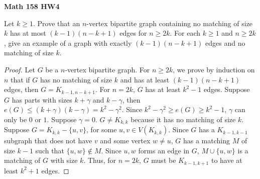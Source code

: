 \documentclass{article}
\newenvironment{problem}[2][Question]{\begin{trivlist}
\item[\hskip \labelsep {\bfseries #1}\hskip \labelsep {\bfseries #2.}]}{\end{trivlist}}
\begin{document}
 

\textbf{Math 158 HW4}

\begin{problem}{5.9.2}
     Let $k \geq 1$. Prove that an $n$-vertex bipartite graph containing no matching of size $k$ has at most $(k - 1)(n - k + 1)$ edges for $n \geq 2k$. For each $k \geq 1$ and $n \geq 2k$, give an example of a graph with exactly $(k - 1)(n - k + 1)$ edges and no matching of size $k$.
\end{problem}

\begin{proof}
    Let $G$ be a $n$-vertex bipartite graph. For $n \geq 2k$, we prove by induction on $n$ that if $G$ has no matching of size $k$ and has at least $(k-1)(n - k + 1)$ edges, then $G = K_{k-1,n-k+1}$. For $n = 2k$, $G$ has at least $k^2 - 1$ edges. Suppose $G$ has parts with sizes $k + \gamma$ and $k - \gamma$, then $e(G) \leq (k + \gamma)(k - \gamma) = k^2 - \gamma^2$. Since $k^2 - \gamma^2 \geq e(G) \geq k^2 - 1$, $\gamma$ can only be $0$ or $1$. Suppose $\gamma = 0$. $G \neq K_{k,k}$ because it has no matching of size $k$. Suppose $G = K_{k,k} - \{u, v\}$, for some $u,v \in V(K_{k,k})$. Since $G$ has a $K_{k-1,k-1}$ subgraph that does not have $v$ and some vertex $w \neq u$, $G$ has a matching $M$ of size $k - 1$ such that $\{u, w\} \notin M$. Since $u,w$ forms an edge in $G$, $M \cup \{u, w\}$ is a matching of $G$ with size $k$. Thus, for $n = 2k$, $G$ must be $K_{k-1,k+1}$ to have at least $k^2 + 1$ edges. 
    

\end{proof}
\end{document}
